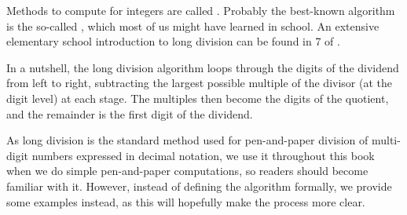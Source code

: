 Methods to compute  for integers are called . Probably the best-known algorithm is the so-called , which most of us might have learned in school. An extensive elementary school introduction to long division can be found in \chaptname{} 7 of \cite{wu-1}.

In a nutshell, the long division algorithm loops through the digits of the dividend from left to right, subtracting the largest possible multiple of the divisor (at the digit level) at each stage. The multiples then become the digits of the quotient, and the remainder is the first digit of the dividend.

As long division is the standard method used for pen-and-paper division of multi-digit numbers expressed in decimal notation, we use it throughout this book when we do simple pen-and-paper computations, so readers should become familiar with it. However, instead of defining the algorithm formally, we  provide some examples instead, as this will hopefully make the process more clear.

